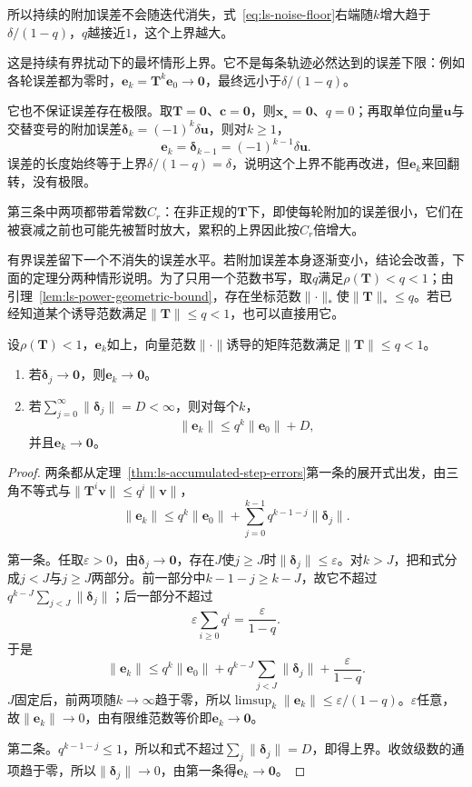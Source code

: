 所以持续的附加误差不会随迭代消失，式~\eqref{eq:ls-noise-floor}右端随$k$增大趋于$\delta/(1-q)$，$q$越接近$1$，这个上界越大。

这是持续有界扰动下的最坏情形上界。它不是每条轨迹必然达到的误差下限：例如各轮误差都为零时，$\bm e_k=\bm T^k\bm e_0\to\bm0$，最终远小于$\delta/(1-q)$。

它也不保证误差存在极限。取$\bm T=\bm0$、$\bm c=\bm0$，则$\bm x_\star=\bm0$、$q=0$；再取单位向量$\bm u$与交替变号的附加误差$\bm\delta_k=(-1)^k\delta\bm u$，则对$k\geq1$，
\[
 \bm e_k=\bm\delta_{k-1}=(-1)^{k-1}\delta\bm u .
\]
误差的长度始终等于上界$\delta/(1-q)=\delta$，说明这个上界不能再改进，但$\bm e_k$来回翻转，没有极限。

第三条中两项都带着常数$C_r$：在非正规的$\bm T$下，即使每轮附加的误差很小，它们在被衰减之前也可能先被暂时放大，累积的上界因此按$C_r$倍增大。

有界误差留下一个不消失的误差水平。若附加误差本身逐渐变小，结论会改善，下面的定理分两种情形说明。为了只用一个范数书写，取$q$满足$\rho(\bm T)<q<1$；由引理~\ref{lem:ls-power-geometric-bound}，存在坐标范数$\lVert\cdot\rVert_*$使$\lVert\bm T\rVert_*\leq q$。若已经知道某个诱导范数满足$\lVert\bm T\rVert\leq q<1$，也可以直接用它。

\begin{theorem}[趋零与可求和的逐步误差]
\label{thm:recurrence-vanishing-summable-errors}
设$\rho(\bm T)<1$，$\bm e_k$如上，向量范数$\lVert\cdot\rVert$诱导的矩阵范数满足$\lVert\bm T\rVert\leq q<1$。
\begin{enumerate}
 \item 若$\bm\delta_j\to\bm0$，则$\bm e_k\to\bm0$。
 \item 若$\sum_{j=0}^\infty\lVert\bm\delta_j\rVert=D<\infty$，则对每个$k$，
 \begin{equation}
  \lVert\bm e_k\rVert\leq q^k\lVert\bm e_0\rVert+D ,
  \label{eq:ls-summable-step-errors}
 \end{equation}
 并且$\bm e_k\to\bm0$。
\end{enumerate}
\end{theorem}
\begin{proof}
两条都从定理~\ref{thm:ls-accumulated-step-errors}第一条的展开式出发，由三角不等式与$\lVert\bm T^i\bm v\rVert\leq q^i\lVert\bm v\rVert$，
\[
 \lVert\bm e_k\rVert\leq q^k\lVert\bm e_0\rVert+\sum_{j=0}^{k-1}q^{k-1-j}\lVert\bm\delta_j\rVert .
\]

第一条。任取$\varepsilon>0$，由$\bm\delta_j\to\bm0$，存在$J$使$j\geq J$时$\lVert\bm\delta_j\rVert\leq\varepsilon$。对$k>J$，把和式分成$j<J$与$j\geq J$两部分。前一部分中$k-1-j\geq k-J$，故它不超过$q^{k-J}\sum_{j<J}\lVert\bm\delta_j\rVert$；后一部分不超过
\[
 \varepsilon\sum_{i\geq0}q^i=\frac{\varepsilon}{1-q}.
\]
于是
\[
 \lVert\bm e_k\rVert\leq q^k\lVert\bm e_0\rVert+q^{k-J}\sum_{j<J}\lVert\bm\delta_j\rVert+\frac{\varepsilon}{1-q}.
\]
$J$固定后，前两项随$k\to\infty$趋于零，所以$\limsup_k\lVert\bm e_k\rVert\leq\varepsilon/(1-q)$。$\varepsilon$任意，故$\lVert\bm e_k\rVert\to0$，由有限维范数等价即$\bm e_k\to\bm0$。

第二条。$q^{k-1-j}\leq1$，所以和式不超过$\sum_j\lVert\bm\delta_j\rVert=D$，即得上界。收敛级数的通项趋于零，所以$\lVert\bm\delta_j\rVert\to0$，由第一条得$\bm e_k\to\bm0$。
\end{proof}


